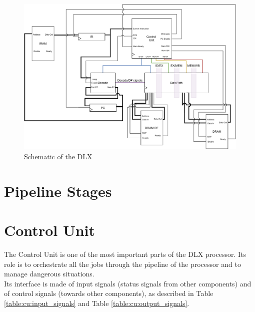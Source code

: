 \begin{figure}[ht]
    \centering
    \includegraphics[width=1\textwidth]{chapters/2_dlx/images/DLX.pdf}
    \caption{Schematic of the DLX}
    \label{DLX}
\end{figure} 

\newpage
\section{Pipeline Stages}

\section{Control Unit}

The Control Unit is one of the most important parts of the DLX processor. Its role is to orchestrate all the jobs through the pipeline of the processor and to manage dangerous situations.\\

Its interface is made of input signals (status signals from other components) and of control signals (towards other components), as described in Table \ref{table:cu:input_signals} and Table \ref{table:cu:output_signals}.

